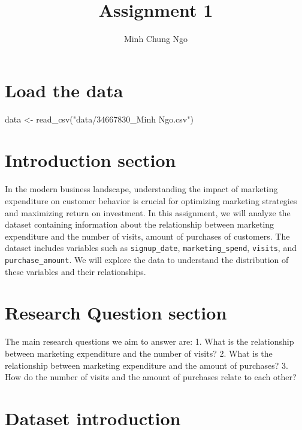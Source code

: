 \documentclass[
  letterpaper,
  DIV=11,
  numbers=noendperiod]{scrartcl}
\title{Assignment 1}
\author{Minh Chung Ngo}
\date{}
\newenvironment{Shaded}{\begin{snugshade}}{\end{snugshade}}
\newcommand{\FunctionTok}[1]{\textcolor[rgb]{0.28,0.35,0.67}{#1}}
\newcommand{\NormalTok}[1]{\textcolor[rgb]{0.00,0.23,0.31}{#1}}
\newcommand{\OtherTok}[1]{\textcolor[rgb]{0.00,0.23,0.31}{#1}}
\newcommand{\StringTok}[1]{\textcolor[rgb]{0.13,0.47,0.30}{#1}}
\renewcommand*\contentsname{Table of contents}
\newcommand\contentsname{Table of contents}
\begin{document}
\maketitle

\renewcommand*\contentsname{Table of contents}
{
\hypersetup{linkcolor=}
\setcounter{tocdepth}{3}
\tableofcontents
}

\section{Load the data}\label{load-the-data}

\begin{Shaded}
\begin{Highlighting}[]
\NormalTok{data }\OtherTok{\textless{}{-}} \FunctionTok{read\_csv}\NormalTok{(}\StringTok{"data/34667830\_Minh Ngo.csv"}\NormalTok{)}
\end{Highlighting}
\end{Shaded}

\section{Introduction section}\label{introduction-section}

In the modern business landscape, understanding the impact of marketing
expenditure on customer behavior is crucial for optimizing marketing
strategies and maximizing return on investment. In this assignment, we
will analyze the dataset containing information about the relationship
between marketing expenditure and the number of visits, amount of
purchases of customers. The dataset includes variables such as
\texttt{signup\_date}, \texttt{marketing\_spend}, \texttt{visits}, and
\texttt{purchase\_amount}. We will explore the data to understand the
distribution of these variables and their relationships.

\section{Research Question section}\label{research-question-section}

The main research questions we aim to answer are: 1. What is the
relationship between marketing expenditure and the number of visits? 2.
What is the relationship between marketing expenditure and the amount of
purchases? 3. How do the number of visits and the amount of purchases
relate to each other?

\section{Dataset introduction}\label{dataset-introduction}
\end{document}

